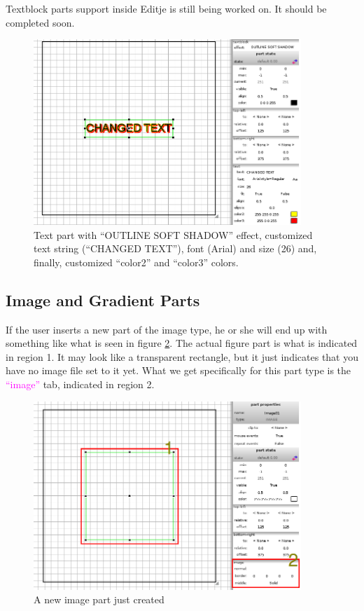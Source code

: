 \documentclass[a4paper]{profusion}
\newcommand{\GUILabel}[1]{\textcolor{magenta}{#1}}
\begin{document}
Textblock parts support inside Editje is still being worked on. It
should be completed soon.


\begin{figure}[h!]
  \centering
  \includegraphics[width=0.9\textwidth]{images/text_misc.png}
  \caption{Text part with ``OUTLINE SOFT SHADOW'' effect, customized
    text string (``CHANGED TEXT''), font (Arial) and size (26) and,
    finally, customized ``color2'' and ``color3'' colors.}
  \label{fig:text_misc}
\end{figure}

\subsection{Image and Gradient Parts}

If the user inserts a new part of the image type, he or she will end
up with something like what is seen in figure \ref{fig:new_image}.
The actual figure part is what is indicated in region 1. It may look
like a transparent rectangle, but it just indicates that you have no
image file set to it yet. What we get specifically for this part type
is the \GUILabel{``image''} tab, indicated in region 2.

\begin{figure}[h!]
  \centering
  \includegraphics[width=0.9\textwidth]{images/new_image.png}
  \caption{A new image part just created}
  \label{fig:new_image}
\end{figure}
\end{document}
